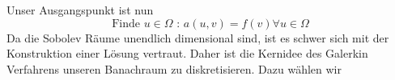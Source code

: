 Unser Ausgangspunkt ist nun
\begin{equation}
\text{Finde } u \in \Omega \text{ : } a(u,v) = f(v) \forall u \in \Omega
\end{equation}
Da die Sobolev Räume unendlich dimensional sind, ist es schwer sich mit der Konstruktion einer Lösung vertraut. Daher ist die Kernidee des Galerkin Verfahrens unseren Banachraum zu diskretisieren. 
Dazu wählen wir 